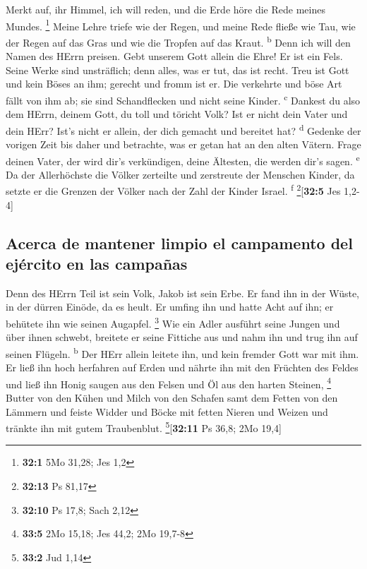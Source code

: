  Merkt auf, ihr Himmel, ich will reden, und die Erde höre
die Rede meines Mundes. \footnote{\textbf{32:1} 5Mo 31,28; Jes 1,2}
 Meine Lehre triefe wie der Regen, und meine Rede fließe
wie Tau, wie der Regen auf das Gras und wie die Tropfen auf das Kraut.
\textsuperscript{b}  Denn ich will den Namen des HErrn
preisen. Gebt unserem Gott allein die Ehre!  Er ist ein
Fels. Seine Werke sind unsträflich; denn alles, was er tut, das ist
recht. Treu ist Gott und kein Böses an ihm; gerecht und fromm ist er.
 Die verkehrte und böse Art fällt von ihm ab; sie sind
Schandflecken und nicht seine Kinder. \textsuperscript{c} 
Dankest du also dem HErrn, deinem Gott, du toll und töricht Volk? Ist er
nicht dein Vater und dein HErr? Ist's nicht er allein, der dich gemacht
und bereitet hat? \textsuperscript{d}  Gedenke der vorigen
Zeit bis daher und betrachte, was er getan hat an den alten Vätern.
Frage deinen Vater, der wird dir's verkündigen, deine Ältesten, die
werden dir's sagen. \textsuperscript{e}  Da der
Allerhöchste die Völker zerteilte und zerstreute der Menschen Kinder, da
setzte er die Grenzen der Völker nach der Zahl der Kinder Israel.
\textsuperscript{f} \footnote{\textbf{32:13} Ps 81,17}{[}\textbf{32:5}
Jes 1,2-4{]}

\hypertarget{acerca-de-mantener-limpio-el-campamento-del-ejuxe9rcito-en-las-campauxf1as}{%
\subsection{Acerca de mantener limpio el campamento del ejército en las
campañas}\label{acerca-de-mantener-limpio-el-campamento-del-ejuxe9rcito-en-las-campauxf1as}}

 Denn des HErrn Teil ist sein Volk, Jakob ist sein Erbe.
 Er fand ihn in der Wüste, in der dürren Einöde, da es
heult. Er umfing ihn und hatte Acht auf ihn; er behütete ihn wie seinen
Augapfel. \footnote{\textbf{32:10} Ps 17,8; Sach 2,12} 
Wie ein Adler ausführt seine Jungen und über ihnen schwebt, breitete er
seine Fittiche aus und nahm ihn und trug ihn auf seinen Flügeln.
\textsuperscript{b}  Der HErr allein leitete ihn, und
kein fremder Gott war mit ihm.  Er ließ ihn hoch
herfahren auf Erden und nährte ihn mit den Früchten des Feldes und ließ
ihn Honig saugen aus den Felsen und Öl aus den harten Steinen,
\footnote{\textbf{33:5} 2Mo 15,18; Jes 44,2; 2Mo 19,7-8} 
Butter von den Kühen und Milch von den Schafen samt dem Fetten von den
Lämmern und feiste Widder und Böcke mit fetten Nieren und Weizen und
tränkte ihn mit gutem Traubenblut. \footnote{\textbf{33:2} Jud 1,14}{[}\textbf{32:11}
Ps 36,8; 2Mo 19,4{]}

